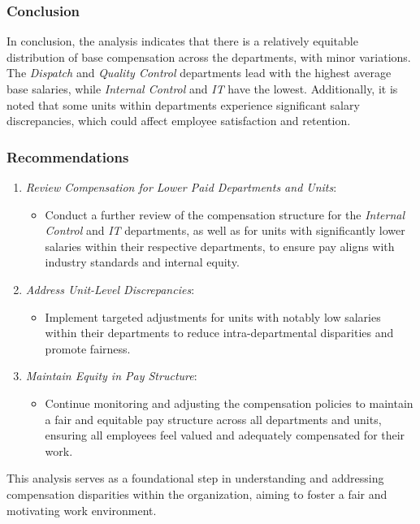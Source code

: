 \documentclass[
]{article}
\providecommand{\tightlist}{%
  \setlength{\itemsep}{0pt}\setlength{\parskip}{0pt}}
\begin{document}
\subsubsection{Conclusion}\label{conclusion}

In conclusion, the analysis indicates that there is a relatively
equitable distribution of base compensation across the departments, with
minor variations. The \emph{Dispatch} and \emph{Quality Control}
departments lead with the highest average base salaries, while
\emph{Internal Control} and \emph{IT} have the lowest. Additionally, it
is noted that some units within departments experience significant
salary discrepancies, which could affect employee satisfaction and
retention.

\subsubsection{Recommendations}\label{recommendations}

\begin{enumerate}
\def\labelenumi{\arabic{enumi}.}
\tightlist
\item
  \emph{Review Compensation for Lower Paid Departments and Units}:

  \begin{itemize}
  \tightlist
  \item
    Conduct a further review of the compensation structure for the
    \emph{Internal Control} and \emph{IT} departments, as well as for
    units with significantly lower salaries within their respective
    departments, to ensure pay aligns with industry standards and
    internal equity.
  \end{itemize}
\item
  \emph{Address Unit-Level Discrepancies}:

  \begin{itemize}
  \tightlist
  \item
    Implement targeted adjustments for units with notably low salaries
    within their departments to reduce intra-departmental disparities
    and promote fairness.
  \end{itemize}
\item
  \emph{Maintain Equity in Pay Structure}:

  \begin{itemize}
  \tightlist
  \item
    Continue monitoring and adjusting the compensation policies to
    maintain a fair and equitable pay structure across all departments
    and units, ensuring all employees feel valued and adequately
    compensated for their work.
  \end{itemize}
\end{enumerate}

This analysis serves as a foundational step in understanding and
addressing compensation disparities within the organization, aiming to
foster a fair and motivating work environment.
\end{document}
